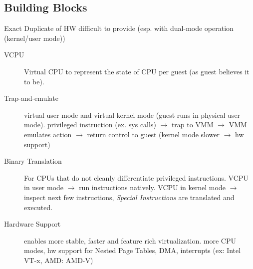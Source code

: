 \subsection*{Building Blocks}
Exact Duplicate of HW difficult to provide (esp. with dual-mode operation (kernel/user mode))
\begin{description}
    \item[VCPU]Virtual CPU to represent the state of CPU per guest (as guest believes it to be).  %
    \item[Trap-and-emulate] virtual user mode and virtual kernel mode (guest runs in physical user mode). privileged instruction (ex. sys calls) $\rightarrow$ trap to VMM $\rightarrow$ VMM emulates action $\rightarrow$ return control to guest (kernel mode slower $\rightarrow$ hw support)
    \item[Binary Translation] For CPUs that do not cleanly differentiate privileged instructions. VCPU in user mode $\rightarrow$  run instructions natively. VCPU in kernel mode $\rightarrow$ inspect next few instructions, \textit{Special Instructions} are translated and executed.
    \item[Hardware Support]enables more stable, faster and feature rich virtualization. more CPU modes, hw support for Nested Page Tables, DMA, interrupts (ex: Intel VT-x, AMD: AMD-V)
\end{description}
